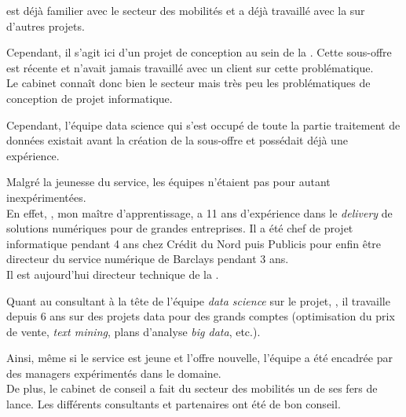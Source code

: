 \tnp est déjà familier avec le secteur des mobilités et a déjà travaillé avec la \sncf sur d'autres projets.

Cependant, il s'agit ici d'un projet de conception au sein de la \df. Cette sous-offre est récente et \tnp n'avait jamais travaillé avec un client sur cette problématique.\\
Le cabinet connaît donc bien le secteur mais très peu les problématiques de conception de projet informatique.

Cependant, l'équipe data science qui s'est occupé de toute la partie traitement de données existait avant la création de la sous-offre et possédait déjà une expérience.

Malgré la jeunesse du service, les équipes n'étaient pas pour autant inexpérimentées.\\
En effet, \damien, mon maître d'apprentissage, a 11 ans d’expérience dans le \emph{delivery} de solutions numériques pour de grandes entreprises. Il a été chef de projet informatique pendant 4 ans chez Crédit du Nord puis Publicis pour enfin être directeur du service numérique de Barclays pendant 3 ans.\\
Il est aujourd'hui directeur technique de la \df.

Quant au consultant à la tête de l'équipe \emph{data science} sur le projet, \artem, il travaille depuis 6 ans sur des projets data pour des grands comptes (optimisation du prix de vente, \textit{text mining}, plans d'analyse \textit{big data}, etc.).

Ainsi, même si le service est jeune et l'offre nouvelle, l'équipe a été encadrée par des managers expérimentés dans le domaine.\\
De plus, le cabinet de conseil a fait du secteur des mobilités un de ses fers de lance. Les différents consultants et partenaires ont été de bon conseil.
